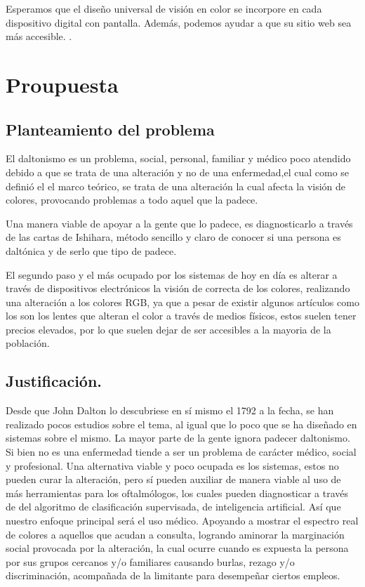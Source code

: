 \documentclass[10pt]{article}
\begin{document}
\setlength{\parskip}{2mm}

Esperamos que el diseño universal de visión en color se incorpore en cada dispositivo digital con pantalla. Además, podemos ayudar a que su sitio web sea más accesible.
\cite{IEEEreferencias:Ref20}.

\section{Proupuesta}

\subsection{Planteamiento del problema}

El daltonismo es un problema, social, personal, familiar y médico poco atendido debido a que se trata de una alteración y no de una enfermedad,el cual como se definió el el marco teórico, se trata de una alteración la cual afecta la visión de colores, provocando problemas a todo aquel que la padece.

\setlength{\parskip}{2mm}

Una manera viable de apoyar a la gente que lo padece, es diagnosticarlo a través de las cartas de Ishihara, método sencillo y claro de conocer si una persona es daltónica y de serlo que tipo de padece.

\setlength{\parskip}{2mm}

El segundo paso y el más ocupado por los sistemas de hoy en día es alterar a través de dispositivos electrónicos la visión de correcta de los colores, realizando una alteración a los colores RGB, ya que a pesar de existir algunos artículos como los son los lentes que alteran el color a través de medios físicos, estos suelen tener precios elevados, por lo que suelen dejar de ser accesibles a la mayoria de la población.

\subsection{Justificación.}

Desde que John Dalton lo descubriese en sí mismo el 1792 \cite{IEEEreferencias:Ref2} a la fecha, se han realizado pocos estudios sobre el tema, al igual que lo poco que se ha diseñado en sistemas sobre el mismo. La mayor parte de la gente ignora padecer daltonismo. Si bien no es una enfermedad tiende a ser un problema de carácter médico, social y profesional. Una alternativa viable y poco ocupada es los sistemas, estos no pueden curar la alteración, pero sí pueden auxiliar de manera viable al uso de más herramientas para los oftalmólogos, los cuales pueden diagnosticar a través de del algoritmo de clasificación supervisada, de inteligencia artificial. Así que nuestro enfoque principal será el uso médico. Apoyando a mostrar el espectro real de colores a aquellos que acudan a consulta, logrando aminorar la marginación social provocada por la alteración, la cual ocurre cuando es expuesta la persona por sus grupos cercanos y/o familiares causando burlas, rezago y/o discriminación, acompañada de la limitante para desempeñar ciertos empleos.
\end{document}
